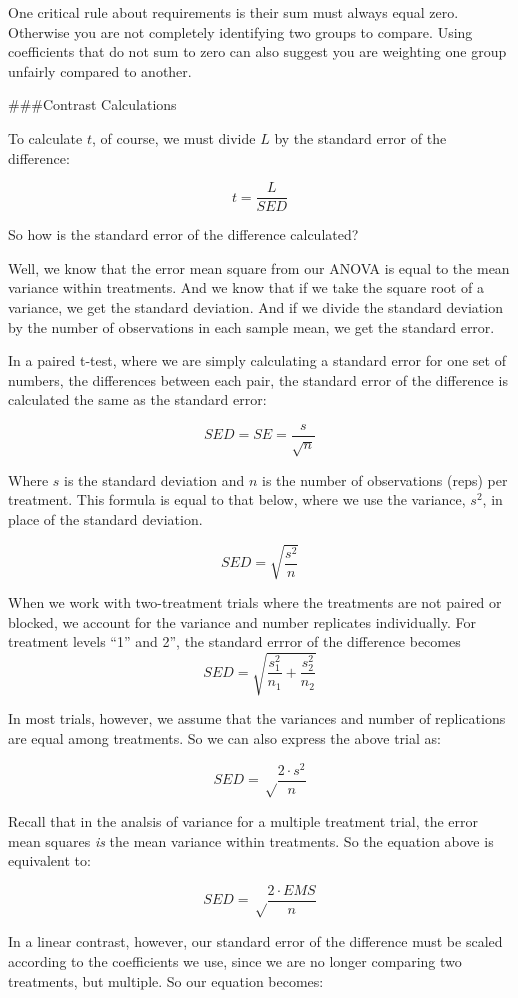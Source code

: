 \documentclass[
]{book}
\begin{document}
One critical rule about requirements is their sum must always equal zero. Otherwise you are not completely identifying two groups to compare. Using coefficients that do not sum to zero can also suggest you are weighting one group unfairly compared to another.

\#\#\#Contrast Calculations

To calculate \(t\), of course, we must divide \(L\) by the standard error of the difference:

\[ t = \frac{L}{SED}\]

So how is the standard error of the difference calculated?

Well, we know that the error mean square from our ANOVA is equal to the mean variance within treatments. And we know that if we take the square root of a variance, we get the standard deviation. And if we divide the standard deviation by the number of observations in each sample mean, we get the standard error.

In a paired t-test, where we are simply calculating a standard error for one set of numbers, the differences between each pair, the standard error of the difference is calculated the same as the standard error:

\[ SED = SE = \frac{s}{\sqrt{n}} \]

Where \(s\) is the standard deviation and \(n\) is the number of observations (reps) per treatment. This formula is equal to that below, where we use the variance, \(s^2\), in place of the standard deviation.

\[ SED = \sqrt{\frac{s^2}{n}} \]

When we work with two-treatment trials where the treatments are not paired or blocked, we account for the variance and number replicates individually. For treatment levels ``1'' and 2'', the standard errror of the difference becomes
\[ SED = \sqrt{\frac{s_1^2}{n_1} + \frac{s_2^2}{n_2}} \]

In most trials, however, we assume that the variances and number of replications are equal among treatments. So we can also express the above trial as:

\[ SED = \sqrt\frac{2 \cdot s^2}{n}\]

Recall that in the analsis of variance for a multiple treatment trial, the error mean squares \emph{is} the mean variance within treatments. So the equation above is equivalent to:

\[ SED = \sqrt\frac{2\cdot EMS}{n}\]

In a linear contrast, however, our standard error of the difference must be scaled according to the coefficients we use, since we are no longer comparing two treatments, but multiple. So our equation becomes:
\end{document}
